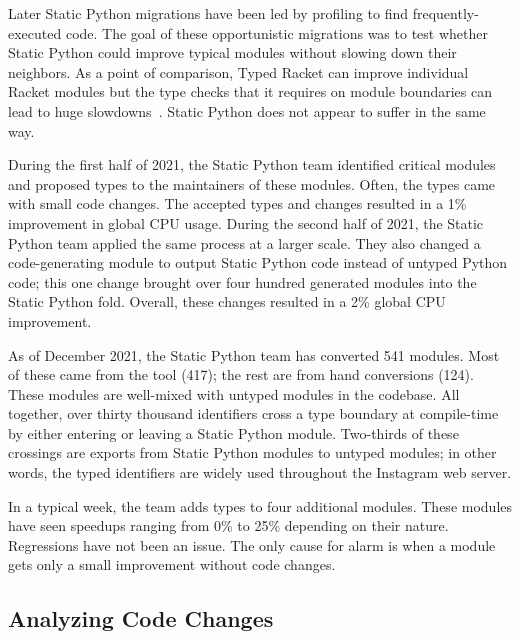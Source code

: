 \documentclass[english,cleveref,submission]{programming}
\newcommand{\SP}{Static Python}
\begin{document}
Later \SP{} migrations have been led by profiling to find frequently-executed code.
The goal of these opportunistic migrations was to test whether \SP{} could
improve typical modules without slowing down their neighbors.
As a point of comparison, Typed Racket can improve individual Racket
modules but the type checks that it requires on module boundaries
can lead to huge slowdowns~\cite{tfgnvf-popl-2016,gtnffvf-jfp-2019}.
\SP{} does not appear to suffer in the same way.

During the first half of 2021, the \SP{} team identified critical
modules and proposed types to the maintainers of these modules.
Often, the types came with small code changes.
The accepted types and changes resulted in a 1\% improvement
in global CPU usage.
During the second half of 2021, the \SP{} team applied the same
process at a larger scale.
They also changed a code-generating module to output \SP{} code instead
of untyped Python code;
this one change brought over four hundred generated modules into the \SP{} fold.
Overall, these changes resulted in a 2\% global CPU improvement.

As of December 2021, the \SP{} team has converted 541 modules.
Most of these came from the tool (417); the rest
are from hand conversions (124).
These modules are well-mixed with untyped modules in the codebase.
All together, over thirty thousand identifiers cross a type boundary
at compile-time by either entering or leaving a \SP{} module.
Two-thirds of these crossings are exports from \SP{} modules
to untyped modules;
in other words, the typed identifiers are widely used throughout the Instagram web server.

In a typical week, the team adds types to four additional modules.
These modules have seen speedups ranging from 0\% to 25\% depending
on their nature.
Regressions have not been an issue.
The only cause for alarm is when a module gets only a small improvement
without code changes.


\subsection{Analyzing Code Changes}
\end{document}
